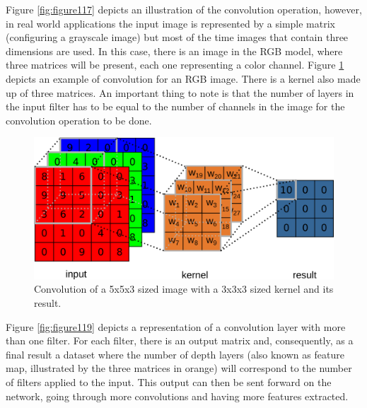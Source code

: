 Figure \ref{fig:figure117} depicts an illustration of the convolution operation, however, in real world applications the input image is represented by a simple matrix (configuring a grayscale image) but most of the time images that contain three dimensions are used. In this case, there is an image in the RGB model, where three matrices will be present, each one representing a color channel. Figure \ref{fig:figure118} depicts an example of convolution for an RGB image. There is a kernel also made up of three matrices. An important thing to note is that the number of layers in the input filter has to be equal to the number of channels in the image for the convolution operation to be done.

\begin{figure}
    \centering
    \includegraphics[scale=0.35]{Part 3 - Learning Systems/Supervised Learning/Deep Learning/images/figure118.png}
    \caption{Convolution of a 5x5x3 sized image with a 3x3x3 sized kernel and its result.} 
    \label{fig:figure118}
\end{figure}

Figure \ref{fig:figure119} depicts a representation of a convolution layer with more than one filter. For each filter, there is an output matrix and, consequently, as a final result a dataset where the number of depth layers (also known as feature map, illustrated by the three matrices in orange) will correspond to the number of filters applied to the input. This output can then be sent forward on the network, going through more convolutions and having more features extracted.

